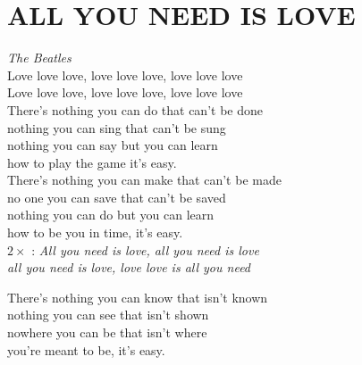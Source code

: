 \section*{\Huge ALL YOU NEED IS LOVE}
\emph{The Beatles}\\

Love love love, 
love love love, 
love love love\\

Love love love,
love love love, 
love love love\\

There's nothing you can do that can't be done\\
nothing you can sing that can't be sung\\
nothing you can say but you can learn\\
how to play the game it's easy.\\

There's nothing you can make that can't be made\\
no one you can save that can't be saved\\
nothing you can do but you can learn\\
how to be you in time, it's easy.\\

$2\times$ \textregistered:
\emph{All you need is love, 
all you need is love\\
all you need is love, love
love is all you need \hspace{0.6cm} \\
}

There's nothing you can know that isn't known\\
nothing you can see that isn't shown\\
nowhere you can be that isn't where\\
you're meant to be, it's easy.\\
\textregistered \textregistered

\newpage
